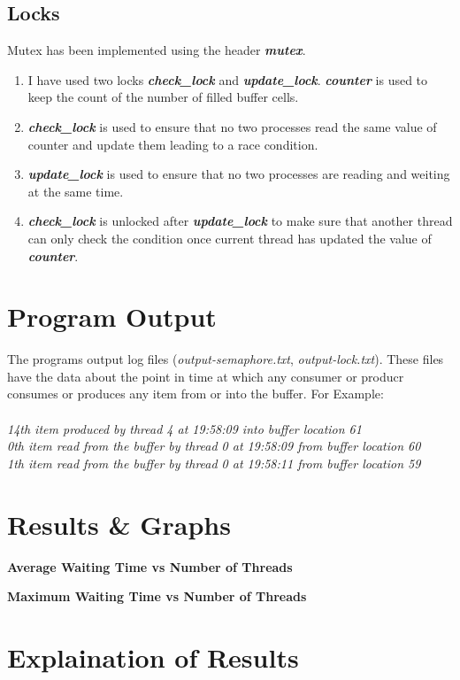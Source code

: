 \documentclass[a4paper,12pt]{report}
\begin{document}
\subsection{Locks}
Mutex has been implemented using the header \textit{\textbf{mutex}}.
\begin{enumerate}
\item I have used two locks \textbf{\textit{check\_lock}} and \textbf{\textit{update\_lock}}. \textbf{\textit{counter}} is used to keep the count of the number of filled buffer cells.
\item \textbf{\textit{check\_lock}} is used to ensure that no two processes read the same value of counter and update them leading to a race condition.
\item \textbf{\textit{update\_lock}} is used to ensure that no two processes are reading and weiting at the same time.
\item \textbf{\textit{check\_lock}} is unlocked after \textbf{\textit{update\_lock}} to make sure that another thread can only check the condition once current thread has updated the value of \textit{\textbf{counter}}.
\end{enumerate}
\newpage
\section{Program Output}
The programs output log files (\textit{output-semaphore.txt}, \textit{output-lock.txt}). These files have the data about the point in time at which any consumer or producr consumes or produces any item from or into the buffer.
For Example:\\\\
\textit{14th item produced by thread 4 at 19:58:09 into buffer location 61\\
0th item read from the buffer by thread 0 at 19:58:09 from buffer location 60\\
1th item read from the buffer by thread 0 at 19:58:11 from buffer location 59}
\newpage
\section{Results \& Graphs}

\begin{center}
\begin{large}
\textbf{Average Waiting Time vs Number of Threads}
\end{large}
\end{center}
\begin{center}
\begin{large}
\textbf{Maximum Waiting Time vs Number of Threads}
\end{large}
\end{center}
\newpage
\section{Explaination of Results}
\end{document}

